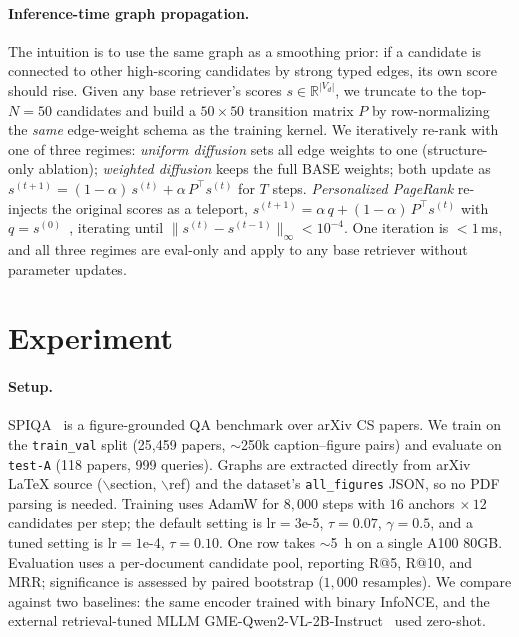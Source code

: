 \documentclass{article}
\begin{document}
\paragraph{Inference-time graph propagation.}
The intuition is to use the same graph as a smoothing prior: if a
candidate is connected to other high-scoring candidates by strong typed
edges, its own score should rise. Given any base retriever's scores
$s\!\in\!\mathbb{R}^{|V_d|}$, we truncate to the top-$N\!=\!50$
candidates and build a $50\!\times\!50$ transition matrix $P$ by
row-normalizing the \emph{same} edge-weight schema as the training
kernel. We iteratively re-rank with one of three regimes: \emph{uniform
diffusion} sets all edge weights to one (structure-only ablation);
\emph{weighted diffusion} keeps the full BASE weights; both update as
$s^{(t+1)}\!=\!(1\!-\!\alpha)\,s^{(t)}+\alpha\,P^\top s^{(t)}$ for $T$
steps. \emph{Personalized PageRank} re-injects the original scores as a
teleport, $s^{(t+1)}\!=\!\alpha\,q+(1\!-\!\alpha)\,P^\top s^{(t)}$ with
$q\!=\!s^{(0)}$~\cite{ppr}, iterating until
$\|s^{(t)}\!-\!s^{(t-1)}\|_\infty\!<\!10^{-4}$. One iteration is
$<\!1$\,ms, and all three regimes are eval-only and apply to any base
retriever without parameter updates.


\section{Experiment}

\paragraph{Setup.}
SPIQA~\cite{spiqa} is a figure-grounded QA benchmark over arXiv CS papers.
We train on the \texttt{train\_val} split (25{,}459 papers, $\sim$250k
caption--figure pairs) and evaluate on \texttt{test-A} (118 papers,
999 queries). Graphs are extracted directly from arXiv LaTeX source
($\backslash$section, $\backslash$ref) and the dataset's
\texttt{all\_figures} JSON, so no PDF parsing is needed. Training uses
AdamW for $8{,}000$ steps with $16$ anchors $\times\,12$ candidates per
step; the default setting is $\text{lr}\!=\!3$e-5, $\tau\!=\!0.07$,
$\gamma\!=\!0.5$, and a tuned setting is $\text{lr}\!=\!1$e-4, $\tau\!=\!0.10$.
One row takes $\sim$5~h on a single A100 80GB. Evaluation uses a
per-document candidate pool, reporting R@5, R@10, and MRR; significance is
assessed by paired bootstrap ($1{,}000$ resamples). We compare against
two baselines: the same encoder trained with binary InfoNCE, and the
external retrieval-tuned MLLM GME-Qwen2-VL-2B-Instruct~\cite{gme} used
zero-shot.
\end{document}
